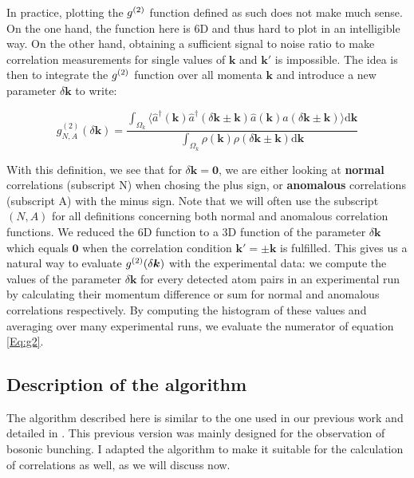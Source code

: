 In practice, plotting the $g^{(2)}$ function defined as such does not make much sense. On the one hand, the function here is 6D and thus hard to plot in an intelligible way. On the other hand, obtaining a sufficient signal to noise ratio to make correlation measurements for single values of $\bm{k}$ and $\bm{k'}$ is impossible. The idea is then to integrate the $g^{(2)}$ function over all momenta $\bm{k}$ and introduce a new parameter $\delta \bm{k}$ to write:

\begin{equation}
    g_{N,A}^{(2)} (\delta {\bm k})=\frac{\int_{\Omega_{k}} \langle \hat{a}^{\dagger}({\bm k}) \hat{a}^{\dagger}(\delta {\bm k} \pm {\bm k}) \hat{a}({\bm k}) \hat{a}(\delta {\bm k} \pm {\bm k}) \rangle \mathrm{d}{\bm k}}{\int_{\Omega_{k}} \rho({\bm k}) \rho(\delta {\bm k} \pm {\bm k}) \mathrm{d}\bm{k}}
    \label{Eq:g2}
\end{equation}

\noindent With this definition, we see that for $\delta \bm{k}=\bm{0}$, we are either looking at \textbf{normal} \kk correlations (subscript N) when chosing the plus sign, or \textbf{anomalous} \kmk correlations (subscript A) with the minus sign. Note that we will often use the subscript $(N,A)$ for all definitions concerning both normal and anomalous correlation functions. We reduced the 6D function to a 3D function of the parameter $\delta \bm{k}$ which equals $\bm{0}$ when the correlation condition $\bm{k'} = \pm \bm{k}$ is fulfilled. This gives us a natural way to evaluate $g^{(2)} (\delta \bm{k})$ with the experimental data: we compute the values of the parameter $\delta \bm{k}$ for every detected atom pairs in an experimental run by calculating their momentum difference or sum for normal and anomalous correlations respectively. By computing the histogram of these values and averaging over many experimental runs, we evaluate the numerator of equation \ref{Eq:g2}.

\subsection{Description of the algorithm}

The algorithm described here is similar to the one used in our previous work \cite{carcy2019momentum,cayla2020} and detailed in \cite{cayla_these,carcy_these}. This previous version was mainly designed for the observation of bosonic bunching. I adapted the algorithm to make it suitable for the calculation of \kmk correlations as well, as we will discuss now.

